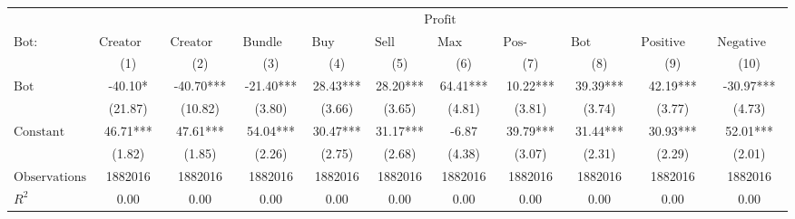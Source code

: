 \begin{tabular}{lcccccccccc}
\hline
 & \multicolumn{10}{c}{$\text{Profit}$} \\
 $\text{Bot}:$ & $\text{Creator Bundle Launch}$ & $\text{Creator Bundle Buy}$ & $\text{Bundle Launch}$ & $\text{Buy Bundle}$ & $\text{Sell Bundle}$ & $\text{Max Same Txn}$ & $\text{Pos-\#Swaps Ratio}$ & $\text{Bot Comment}$ & $\text{Positive Comment Bot}$ & $\text{Negative Comment Bot}$ \\
 & (1) & (2) & (3) & (4) & (5) & (6) & (7) & (8) & (9) & (10)\\
\hline
$\text{Bot}$ & -40.10* & -40.70*** & -21.40*** & 28.43*** & 28.20*** & 64.41*** & 10.22*** & 39.39*** & 42.19*** & -30.97*** \\
 & (21.87) & (10.82) & (3.80) & (3.66) & (3.65) & (4.81) & (3.81) & (3.74) & (3.77) & (4.73) \\
$\text{Constant}$ & 46.71*** & 47.61*** & 54.04*** & 30.47*** & 31.17*** & -6.87 & 39.79*** & 31.44*** & 30.93*** & 52.01*** \\
 & (1.82) & (1.85) & (2.26) & (2.75) & (2.68) & (4.38) & (3.07) & (2.31) & (2.29) & (2.01) \\
$\text{Observations}$ & 1882016 & 1882016 & 1882016 & 1882016 & 1882016 & 1882016 & 1882016 & 1882016 & 1882016 & 1882016 \\
$R^2$ & 0.00 & 0.00 & 0.00 & 0.00 & 0.00 & 0.00 & 0.00 & 0.00 & 0.00 & 0.00 \\
\hline
\end{tabular}